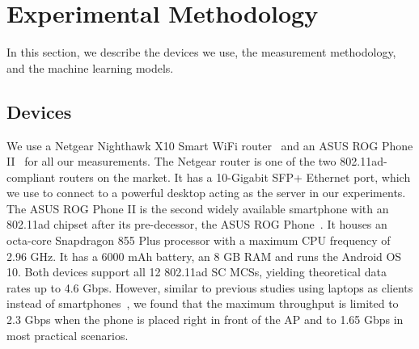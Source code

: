 \documentclass[sigconf,anonymous]{acmart}
\begin{document}
\section{Experimental Methodology} %

In this section, we describe the devices we use, the measurement methodology, and the machine learning models.

\subsection{Devices}

We use a Netgear Nighthawk X10 Smart WiFi router~\cite{netgear-x10} and an ASUS ROG Phone II~\cite{rog-phone-2} for all our measurements. The Netgear router is one of the two 802.11ad-compliant routers on the market. It has a 10-Gigabit SFP+ Ethernet port, which we use to connect to a powerful desktop acting as the server in our experiments. The ASUS ROG Phone II is the second widely available smartphone with an 802.11ad chipset after its pre-decessor, the ASUS ROG Phone~\cite{rog-phone}. It houses an octa-core Snapdragon 855 Plus processor with a maximum CPU frequency of 2.96 GHz. It has a 6000 mAh battery, an 8 GB RAM and runs the Android OS 10. Both devices support all 12 802.11ad SC MCSs, yielding theoretical data rates up to 4.6 Gbps. However, similar to previous studies using laptops as clients instead of smartphones~\cite{sur:mobicom2017,saha:secon2018,baig:mobicom2019,saha:mobicom2019}, we found that the maximum throughput is limited to 2.3 Gbps when the phone is placed right in front of the AP and to 1.65 Gbps in most practical scenarios.




\end{document}
